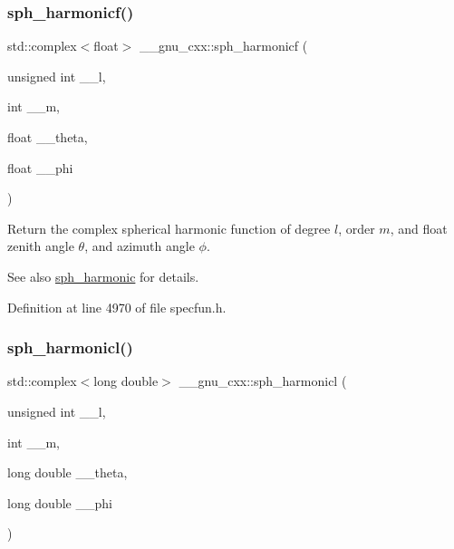 \subsubsection{\texorpdfstring{sph\+\_\+harmonicf()}{sph\_harmonicf()}}
{\footnotesize\ttfamily std\+::complex$<$float$>$ \+\_\+\+\_\+gnu\+\_\+cxx\+::sph\+\_\+harmonicf (\begin{DoxyParamCaption}\item[{unsigned int}]{\+\_\+\+\_\+l,  }\item[{int}]{\+\_\+\+\_\+m,  }\item[{float}]{\+\_\+\+\_\+theta,  }\item[{float}]{\+\_\+\+\_\+phi }\end{DoxyParamCaption})\hspace{0.3cm}{\ttfamily [inline]}}

Return the complex spherical harmonic function of degree $ l $, order $ m $, and {\ttfamily float} zenith angle $ \theta $, and azimuth angle $ \phi $.

\begin{DoxySeeAlso}{See also}
\hyperlink{group__gnu__math__spec__func_gacbff28988d5d36f0c3b3fe03d4f57896}{sph\+\_\+harmonic} for details. 
\end{DoxySeeAlso}


Definition at line 4970 of file specfun.\+h.

\mbox{\label{group__gnu__math__spec__func_ga414c8374b4579aa14e38f5401304b6fa}} 
\subsubsection{\texorpdfstring{sph\+\_\+harmonicl()}{sph\_harmonicl()}}
{\footnotesize\ttfamily std\+::complex$<$long double$>$ \+\_\+\+\_\+gnu\+\_\+cxx\+::sph\+\_\+harmonicl (\begin{DoxyParamCaption}\item[{unsigned int}]{\+\_\+\+\_\+l,  }\item[{int}]{\+\_\+\+\_\+m,  }\item[{long double}]{\+\_\+\+\_\+theta,  }\item[{long double}]{\+\_\+\+\_\+phi }\end{DoxyParamCaption})\hspace{0.3cm}{\ttfamily [inline]}}

